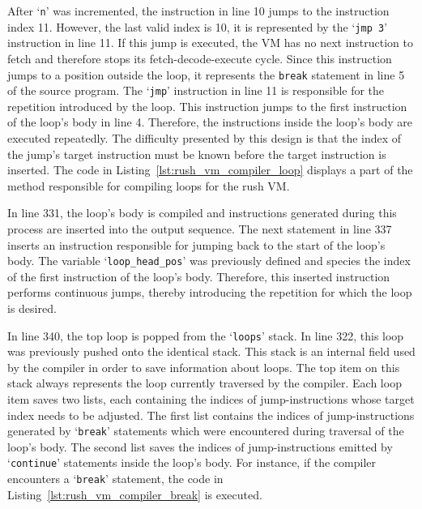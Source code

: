 After `\texttt{n}' was incremented, the instruction in line 10 jumps to the instruction index 11.
However, the last valid index is 10, it is represented by the `\texttt{jmp 3}' instruction in line 11.
If this jump is executed, the VM has no next instruction to fetch and therefore stops its fetch-decode-execute cycle.
Since this instruction jumps to a position outside the loop, it represents the \texttt{break} statement in line 5 of the source program.
The `\texttt{jmp}' instruction in line 11 is responsible for the repetition introduced by the loop.
This instruction jumps to the first instruction of the loop's body in line 4.
Therefore, the instructions inside the loop's body are executed repeatedly.
The difficulty presented by this design is that the index of the jump's target instruction must be known before the target instruction is inserted.
The code in Listing~\ref{lst:rush_vm_compiler_loop} displays a part of the method responsible for compiling loops for the rush VM\@.


In line 331, the loop's body is compiled and instructions generated during this process are inserted into the output sequence.
The next statement in line 337 inserts an instruction responsible for jumping back to the start of the loop's body.
The variable `\texttt{loop\_head\_pos}' was previously defined and species the index of the first instruction of the loop's body.
Therefore, this inserted instruction performs continuous jumps, thereby introducing the repetition for which the loop is desired.

In line 340, the top loop is popped from the `\texttt{loops}' stack.
In line 322, this loop was previously pushed onto the identical stack.
This stack is an internal field used by the compiler in order to save information about loops.
The top item on this stack always represents the loop currently traversed by the compiler.
Each loop item saves two lists, each containing the indices of jump-instructions whose target index needs to be adjusted.
The first list contains the indices of jump-instructions generated by `\texttt{break}' statements which were encountered during traversal of the loop's body.
The second list saves the indices of jump-instructions emitted by `\texttt{continue}' statements inside the loop's body.
For instance, if the compiler encounters a `\texttt{break}' statement, the code in Listing~\ref{lst:rush_vm_compiler_break} is executed.

